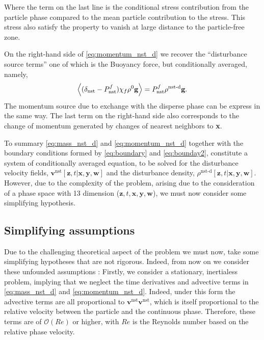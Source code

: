 Where the term on the last line is the conditional stress contribution from the particle phase compared to the mean particle contribution to the stress. 
This stress also satisfy the property to vanish at large distance to the particle-free zone.

On the right-hand side of \ref{eq:momentum_nst_d} we recover the ``disturbance source terms'' one of which is the Buoyancy force, but conditionally averaged, namely, 
\begin{equation*}
    \left<(\delta_\text{nst} - P_\text{nst}^f) \chi_f \rho^0 \textbf{g}\right>
    = 
    P_\text{nst}^f \rho^\text{nst-d} \textbf{g}. 
\end{equation*}
The momentum source due to exchange with the disperse phase can be express in the same way. 
The last term on the right-hand side also corresponds to the change of momentum generated by changes of nearest neighbors to \textbf{x}. 

To summary \ref{eq:mass_nst_d} and \ref{eq:momentum_nst_d} together with the boundary conditions formed by \ref{eq:boundary} and \ref{eq:bounday2}, constitute a system of conditionally averaged equation, to be solved for the disturbance velocity fields, $\textbf{v}^\text{nst}[\textbf{z},t|\textbf{x},\textbf{y},\textbf{w}]$ and the disturbance density, $\rho^\text{nst-d}[\textbf{z},t|\textbf{x},\textbf{y},\textbf{w}]$.
However, due to the complexity of the problem, arising due to the consideration of a phase space with  13 dimension ($\textbf{z},t,\textbf{x},\textbf{y},\textbf{w}$), we must now consider some simplifying hypothesis.

\subsection{Simplifying assumptions}

Due to the challenging theoretical aspect of the problem we must now, take some simplifying hypotheses that are not rigorous. 
Indeed, from now on we consider these unfounded assumptions :
Firstly, we consider a stationary, inertialess problem, implying that we neglect the time derivatives and advective terms in \ref{eq:mass_nst_d} and \ref{eq:momentum_nst_d}. 
Indeed, under this form the advective terms are all proportional to $\textbf{v}^\text{nst}\textbf{v}^\text{nst}$, which is itself proportional to the relative velocity between the particle and the continuous phase. 
Therefore, these terms are of $\mathcal{O}(Re)$ or higher, with $Re$ is the Reynolds number based on the relative phase velocity.

